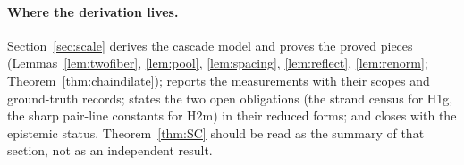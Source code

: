 \paragraph{Where the derivation lives.}
Section~\ref{sec:scale} derives the cascade model and proves the proved
pieces (Lemmas~\ref{lem:twofiber}, \ref{lem:pool}, \ref{lem:spacing},
\ref{lem:reflect}, \ref{lem:renorm}; Theorem~\ref{thm:chaindilate});
reports the measurements with their scopes and ground-truth records;
states the two open obligations (the strand census for H1g, the sharp
pair-line constants for H2m) in their reduced forms; and closes with
the epistemic status. Theorem~\ref{thm:SC} should be read as the
summary of that section, not as an independent result.
